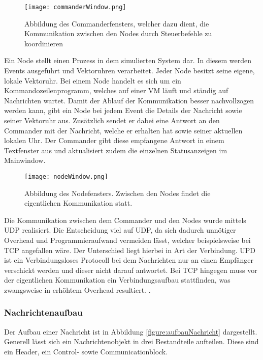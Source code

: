 \begin{figure}[ht]
	\centering
	\texttt{[image: commanderWindow.png]}
	\caption[Commander Window]{Abbildung des Commanderfensters, welcher dazu dient, die Kommunikation zwischen den Nodes durch Steuerbefehle zu koordinieren}
	\label{figure:commanderWindow}
\end{figure}

Ein Node stellt einen Prozess in dem simulierten System dar. In diesem werden Events ausgeführt und Vektoruhren verarbeitet. Jeder Node besitzt seine eigene, lokale Vektoruhr. Bei einem Node handelt es sich um ein Kommandozeilenprogramm, welches auf einer VM läuft und ständig auf Nachrichten wartet. Damit der Ablauf der Kommunikation besser nachvollzogen werden kann, gibt ein Node bei jedem Event die Details der Nachricht sowie seiner Vektoruhr aus. Zusätzlich sendet er dabei eine Antwort an den Commander mit der Nachricht, welche er erhalten hat sowie seiner aktuellen lokalen Uhr. Der Commander gibt diese empfangene Antwort in einem Textfenster aus und aktualisiert zudem die einzelnen Statusanzeigen im Mainwindow.

\begin{figure}[ht]
	\centering
	\texttt{[image: nodeWindow.png]}
	\caption[Node Window]{Abbildung des Nodefensters. Zwischen den Nodes findet die eigentlichen Kommunikation statt.}
\label{figure:nodeWindow}
\end{figure}

Die Kommunikation zwischen dem Commander und den Nodes wurde mittels UDP realisiert. Die Entscheidung viel auf UDP, da sich dadurch unnötiger Overhead und Programmieraufwand vermeiden lässt, welcher beispielsweise bei TCP angefallen wäre. Der Unterschied liegt hierbei in Art der Verbindung. UPD ist ein Verbindungsloses Protocoll bei dem Nachrichten nur an einen Empfänger verschickt werden und dieser nicht darauf antwortet. Bei TCP hingegen muss vor der eigentlichen Kommunikation ein Verbindungsaufbau stattfinden, was zwangsweise in erhöhtem Overhead resultiert. \cite*{Markert2013}.

\FloatBarrier
\subsubsection{Nachrichtenaufbau}
Der Aufbau einer Nachricht ist in Abbildung \ref{figure:aufbauNachricht} dargestellt. Generell lässt sich ein Nachrichtenobjekt in drei Bestandteile aufteilen. Diese sind ein Header, ein Control- sowie Communicationblock. 

